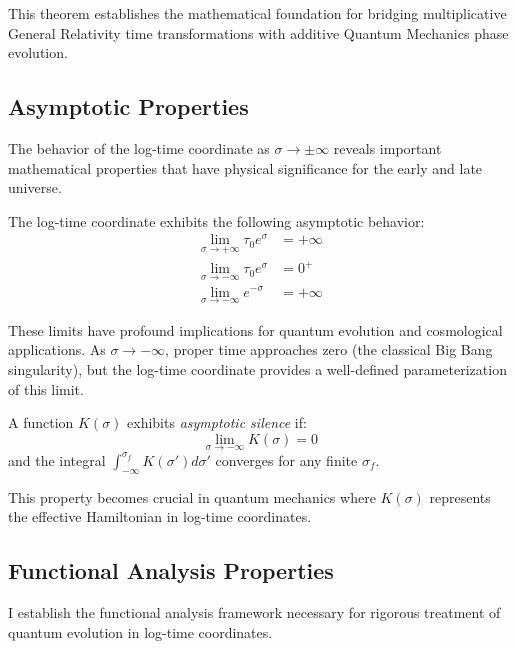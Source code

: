 This theorem establishes the mathematical foundation for bridging multiplicative General Relativity time transformations with additive Quantum Mechanics phase evolution.

\subsection{Asymptotic Properties}
\label{subsec:asymptotic_properties}

The behavior of the log-time coordinate as $\sigma \to \pm\infty$ reveals important mathematical properties that have physical significance for the early and late universe.

\begin{theorem}
\label{thm:asymptotic_limits}
The log-time coordinate exhibits the following asymptotic behavior:
\begin{align}
\lim_{\sigma \to +\infty} \tau_0 e^\sigma &= +\infty \\
\lim_{\sigma \to -\infty} \tau_0 e^\sigma &= 0^+ \\
\lim_{\sigma \to -\infty} e^{-\sigma} &= +\infty
\end{align}
\end{theorem}

These limits have profound implications for quantum evolution and cosmological applications. As $\sigma \to -\infty$, proper time approaches zero (the classical Big Bang singularity), but the log-time coordinate provides a well-defined parameterization of this limit.

\begin{definition}
A function $K(\sigma)$ exhibits \emph{asymptotic silence} if:
\begin{equation}
\lim_{\sigma \to -\infty} K(\sigma) = 0
\end{equation}
and the integral $\int_{-\infty}^{\sigma_f} K(\sigma') d\sigma'$ converges for any finite $\sigma_f$.
\end{definition}

This property becomes crucial in quantum mechanics where $K(\sigma)$ represents the effective Hamiltonian in log-time coordinates.

\subsection{Functional Analysis Properties}
\label{subsec:functional_analysis}

I establish the functional analysis framework necessary for rigorous treatment of quantum evolution in log-time coordinates.

